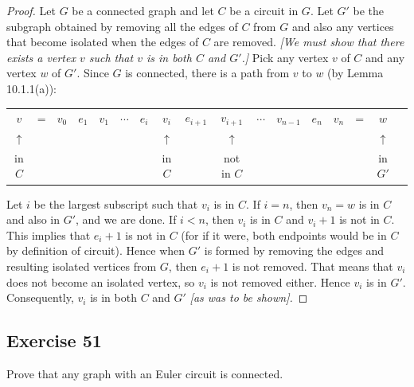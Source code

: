 \documentclass[14pt]{extarticle}
\newcommand{\cy}{\color{cyan}}
\begin{document}
\begin{proof}
    Let \(G\) be a connected graph and let \(C\) be a circuit in \(G\). Let \(G'\) be the subgraph obtained by removing all the
    edges of \(C\) from \(G\) and also any vertices that become isolated when the edges of \(C\) are removed. {\it [We must
                show that there exists a vertex \(v\) such that \(v\) is in both \(C\) and \(G'\).]} Pick any vertex \(v\) of \(C\) and
    any vertex \(w\) of \(G'\). Since \(G\) is connected, there is a path from \(v\) to \(w\) (by Lemma 10.1.1(a)):
    \begin{center}
        \begin{tabular}{ccccccccccccccccc}
            \(v\)              & = & \(v_0\) & \(e_1\) & \(v_1\) & \(\cdots\) & \(e_i\) & \(v_i\)            & \(e_{i+1}\) & \(v_{i+1}\)        & \(\cdots\) & \(v_{n-1}\) & \(e_n\) & \(v_n\) & = & \(w\)              \\
            {\cy \(\uparrow\)} &   &         &         &         &            &         & {\cy \(\uparrow\)} &             & {\cy \(\uparrow\)} &            &             &         &         &   & {\cy \(\uparrow\)} \\
            {\cy in \(C\)}     &   &         &         &         &            &         & {\cy in \(C\)}     &             & {\cy not in \(C\)} &            &             &         &         &   & {\cy in \(G'\)}
        \end{tabular}
    \end{center}
    Let \(i\) be the largest subscript such that \(v_i\) is in \(C\). If \(i = n\), then \(v_n = w\) is in \(C\) and also in
    \(G'\), and we are done. If \(i < n\), then \(v_i\) is in \(C\) and \(v_i + 1\) is not in \(C\). This implies that \(e_i
    + 1\) is not in \(C\) (for if it were, both endpoints would be in \(C\) by definition of circuit). Hence when \(G'\) is
    formed by removing the edges and resulting isolated vertices from \(G\), then \(e_i + 1\) is not removed. That means that
    \(v_i\) does not become an isolated vertex, so \(v_i\) is not removed either. Hence \(v_i\) is in \(G'\). Consequently,
    \(v_i\) is in both \(C\) and \(G'\) {\it [as was to be shown].}
\end{proof}

\subsection{Exercise 51}
Prove that any graph with an Euler circuit is connected.
\end{document}
